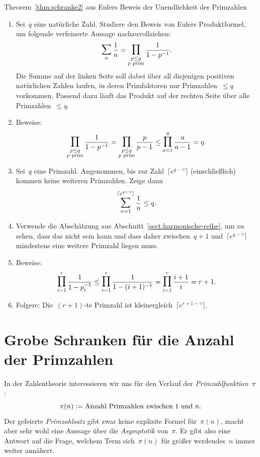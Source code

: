 \documentclass[twoside]{../zirkelblatt1415}
\theoremstyle{definition}
\theoremstyle{plain}
\theoremstyle{remark}
\newcommand{\defeq}{\vcentcolon=}
\newcommand{\prim}[1]{\text{\textnormal{$#1$ prim}}}
\newcommand{\bigsum}{\mathop{\mathlarger{\mathlarger{\sum}}}}
\newcommand{\bigprod}{\mathop{\mathlarger{\mathlarger{\prod}}}}
\begin{document}
\begin{aufgabe}{Theorem~\ref{thm:schranke2} aus Eulers Beweis der
Unendlichkeit der Primzahlen}
\begin{enumerate}
\item Sei~$q$ eine natürliche Zahl. Studiere den Beweis von Eulers
Produktformel, um folgende verfeinerte Aussage nachzuvollziehen:
\[ \bigsum_n \frac{1}{n} = \bigprod_{\substack{p \leq q \\ \prim{p}}} \frac{1}{1 -
p^{-1}}. \]
Die Summe auf der linken Seite soll dabei über all diejenigen positiven
natürlichen Zahlen laufen, in deren Primfaktoren nur Primzahlen~$\leq q$
vorkommen. Passend dazu läuft das Produkt auf der rechten Seite über alle
Primzahlen~$\leq q$.
\item Beweise:
\[
  \bigprod_{\substack{p \leq q \\ \prim{p}}} \frac{1}{1 - p^{-1}} =
  \bigprod_{\substack{p \leq q \\ \prim{p}}} \frac{p}{p - 1} \leq
  \bigprod_{a=1}^q \frac{a}{a - 1} = q. \]
\item Sei~$q$ eine Primzahl. Angenommen, bis zur Zahl~$\lceil e^{q-\gamma}
\rceil$ (einschließlich) kommen keine weiteren Primzahlen. Zeige dann
\[ \bigsum_{n=1}^{\lceil e^{q-\gamma} \rceil} \frac{1}{n} \leq q. \]
\item Verwende die Abschätzung aus Abschnitt~\ref{sect:harmonische-reihe}, um
zu sehen, dass das nicht sein kann und dass daher zwischen~$q+1$ und~$\lceil
e^{q-\gamma} \rceil$ mindestens eine weitere Primzahl liegen muss.
\item Beweise:
\[
  \bigprod_{i=1}^r \frac{1}{1 - p_i^{-1}} \leq
  \bigprod_{i=1}^r \frac{1}{1 - (i+1)^{-1}} =
  \bigprod_{i=1}^r \frac{i+1}{i} = r+1. \]
\item Folgere: Die~$(r+1)$-te Primzahl ist kleinergleich~$\lceil e^{r+1-\gamma} \rceil$.
\end{enumerate}\fixlistspacing
\end{aufgabe}


\section{Grobe Schranken für die Anzahl der Primzahlen}

In der Zahlentheorie interessieren wir uns für den Verlauf der
\emph{Primzahlfunktion}~$\pi$:
\[ \pi(n) \defeq \text{Anzahl Primzahlen zwischen $1$ und $n$}. \]
Der gefeierte \emph{Primzahlsatz} gibt zwar keine explizite Formel für~$\pi(n)$,
macht aber sehr wohl eine Aussage über die \emph{Asymptotik} von~$\pi$. Er gibt
also eine Antwort auf die Frage, welchem Term sich~$\pi(n)$ für größer
werdendes~$n$ immer weiter annähert.
\end{document}
